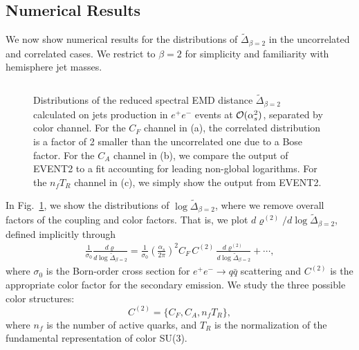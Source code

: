 \documentclass[letterpaper,11pt]{article}
\DeclareRobustCommand{\Fig}[1]{Fig.~\ref{#1}}
\begin{document}
\subsection{Numerical Results}
\label{sec:numerical}


We now show numerical results for the distributions of $\tilde{\Delta}_{\beta = 2}$ in the uncorrelated and correlated cases.  
%
We restrict to $\beta = 2$ for simplicity and familiarity with hemisphere jet masses.

\begin{figure}[t]
\begin{center}
$\qquad$
\\
\caption{
\label{fig:as2plots}
%
Distributions of the reduced spectral EMD distance $\tilde{\Delta}_{\beta = 2}$ calculated on jets production in $e^+e^-$ events at ${\cal O}(\alpha_s^2)$, separated by color channel.
%
For the $C_F$ channel in (a), the correlated distribution is a factor of 2 smaller than the uncorrelated one due to a Bose factor.
%
For the $C_A$ channel in (b), we compare the output of EVENT2 to a fit accounting for leading non-global logarithms.
%
For the $n_f T_R$ channel in (c), we simply show the output from EVENT2.
}
\end{center}
\end{figure}


In \Fig{fig:as2plots}, we show the distributions of $\log\tilde{\Delta}_{\beta = 2}$, where we remove overall factors of the coupling and color factors.  
%
That is, we plot $d\varrho^{(2)}/d\log \tilde \Delta_{\beta = 2}$, defined implicitly through
%
\begin{align}
\frac{1}{\sigma_0}\frac{d\varrho}{d\log \tilde \Delta_{\beta = 2}} = \frac{1}{\sigma_0}\left(
\frac{\alpha_s}{2\pi}
\right)^2C_F \, C^{(2)}\,\frac{d\varrho^{(2)}}{d\log \tilde \Delta_{\beta = 2}} + \cdots ,
\end{align}
%
where $\sigma_0$ is the Born-order cross section for $e^+e^-\to q\bar q$ scattering and $C^{(2)}$ is the appropriate color factor for the secondary emission.  
%
We study the three possible color structures:
%
\begin{equation}
C^{(2)} = \{C_F, C_A, n_f T_R\},
\end{equation}
%
where $n_f$ is the number of active quarks, and $T_R$ is the normalization of the fundamental representation of color SU(3).  
\end{document}
